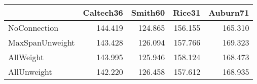\begin{tabular}{lrrrr}
\toprule
{} & Caltech36 & Smith60 &  Rice31 & Auburn71 \\
\midrule
NoConnection    &   144.419 & 124.865 & 156.155 &  165.310 \\
MaxSpanUnweight &   143.428 & 126.094 & 157.766 &  169.323 \\
AllWeight       &   143.995 & 125.946 & 158.124 &  168.473 \\
AllUnweight     &   142.220 & 126.458 & 157.612 &  168.935 \\
\bottomrule
\end{tabular}
